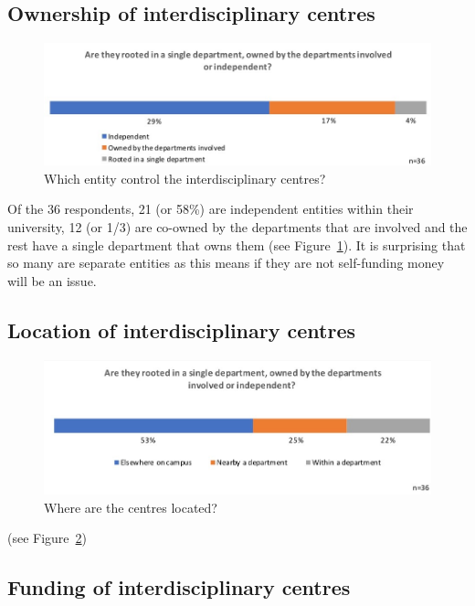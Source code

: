 \subsection{ Ownership of interdisciplinary centres}

\begin{figure}[h]
\centering
\includegraphics[width = \linewidth]{charts/5c.jpg}
\caption{Which entity control the interdisciplinary centres?}
\label{sect5:owners}
\end{figure}

Of the 36 respondents, 21 (or 58\%) are independent entities within their university, 12 (or 1/3) are co-owned by the departments that are involved and the rest have a single department that owns them (see Figure~\ref{sect5:owners}). It is surprising that so many are separate entities as this means if they are not self-funding money will be an issue.

\subsection{ Location of interdisciplinary centres}

\begin{figure}[h]
\centering
\includegraphics[width = \linewidth]{charts/5d.jpg}
\caption{ Where are the centres located?}
\label{sect5:locations}
\end{figure}

(see Figure~\ref{sect5:locations})

\subsection{Funding of interdisciplinary centres}

